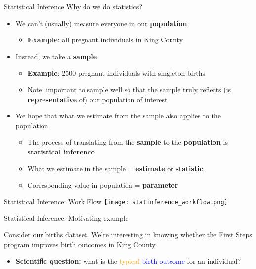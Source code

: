 \documentclass[10pt,t]{beamer}
\begin{document}
\begin{frame}{Statistical Inference} 
Why do we do statistics?
\medskip
\begin{itemize}
	\item We can't (usually) measure everyone in our \textbf{population}
	\smallskip
	\begin{itemize}
		\item \textbf{Example}: all pregnant individuals in King County
	\end{itemize}
\smallskip
	\item Instead, we take a \textbf{sample}
	\begin{itemize}
		\smallskip
		\item \textbf{Example}: 2500 pregnant individuals with singleton births
		\smallskip
		\item Note: important to sample well so that the sample truly reflects (is \textbf{representative} of) our population of interest
	\end{itemize}
\smallskip

	\item We hope that what we estimate from the sample also applies to the population
	\smallskip
	
	\begin{itemize}
		\item The process of translating from the \textbf{sample} to the \textbf{population} is \textbf{statistical inference}
		\smallskip
		
		\item What we estimate in the sample = \textbf{estimate} or \textbf{statistic}
		\smallskip
		
		\item Corresponding value in population = \textbf{parameter}
	\end{itemize}
\end{itemize}
\end{frame}

\begin{frame}[c]{Statistical Inference: Work Flow}
\centering \texttt{[image: statinference\_workflow.png]}
\end{frame}

\begin{frame}{Statistical Inference: Motivating example}

Consider our births dataset. We're interesting in knowing whether the First Steps program improves birth outcomes in King County.

\vspace{0.1cm}

\begin{itemize}
	\item \textbf{Scientific question:} what is the \textcolor{orange}{typical}  \textcolor{blue}{birth outcome} for an individual?

\end{itemize}

\end{frame}
\end{document}
